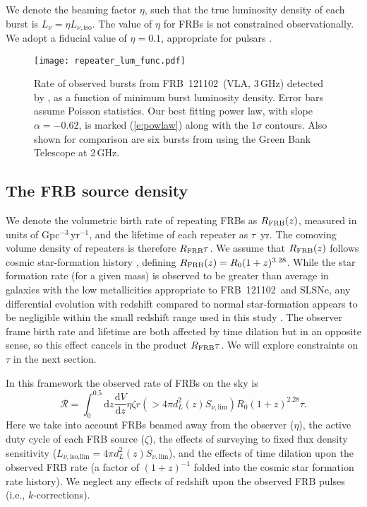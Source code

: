 \documentclass[twocolumn]{aastex6}
\newcommand{\dd}{\ensuremath{\text{d}}}
\newcommand{\Lnil}{\ensuremath{L_{\nu,\text{iso,lim}}}}
\newcommand{\pergpcperyr}{Gpc$^{-3}$\,yr$^{-1}$}
\newcommand{\repeater}{FRB~121102}
\begin{document}
We denote the beaming factor $\eta$, such that the true luminosity density of each burst is $L_\nu = \eta L_{\nu,\text{iso}}$. The value of $\eta$ for FRBs is not constrained observationally. We adopt a fiducial value of $\eta = 0.1$, appropriate for pulsars \citep{tm.1998}.


\begin{figure}
\texttt{[image: repeater\_lum\_func.pdf]}
\caption{Rate of observed bursts from \repeater\ (VLA, 3\,GHz) detected by \citet{clw+.2017}, as a function of minimum burst luminosity density. Error bars assume Poisson statistics. Our best fitting power law, with slope $\alpha = -0.62$, is marked (\autoref{e:powlaw}) along with the $1\sigma$ contours. Also shown for comparison are six bursts from \citet{sch2016} using the Green Bank Telescope at 2\,GHz.}
\label{f:powlaw}
\end{figure}


\subsection{The FRB source density}

We denote the volumetric birth rate of repeating FRBs as $R_{\rm FRB}(z)$, measured in units of \pergpcperyr, and the lifetime of each repeater as $\tau$~yr. The comoving volume density of repeaters is therefore $R_{\rm FRB}\tau$. We assume that $R_{\rm FRB}(z)$ follows cosmic star-formation history \citep{hb.2006,hb.2008}, defining $R_{\rm FRB}(z) = R_0 (1+z)^{3.28}$. While the star formation rate (for a given mass) is observed to be greater than average in galaxies with the low metallicities appropriate to \repeater\ and SLSNe, any differential evolution with redshift compared to normal star-formation appears to be negligible within the small redshift range used in this study \citep[e.g.][]{mannucci2010}. The observer frame birth rate and lifetime are both affected by time dilation but in an opposite sense, so this effect cancels in the product $R_{\rm FRB}\tau$.  We will explore constraints on $\tau$ in the next section.

In this framework the observed rate of FRBs on the sky is
\begin{equation}
\mathcal{R} = \int_0^{0.5} \dd z \frac{\dd V}{\dd z} \eta \zeta r({>}4 \pi d_L^2(z) S_{\nu,\text{lim}}) R_0 (1 + z)^{2.28} \tau.
\label{e:intrate}
\end{equation}
Here we take into account FRBs beamed away from the observer ($\eta$), the active duty cycle of each FRB source ($\zeta$), the effects of surveying to fixed flux density sensitivity ($\Lnil = 4\pi d_L^2(z) S_{\nu,\text{lim}}$), and the effects of time dilation upon the observed FRB rate (a factor of $(1 + z)^{-1}$ folded into the cosmic star formation rate history). We neglect any effects of redshift upon the observed FRB pulses (i.e., $k$-corrections).
\end{document}
